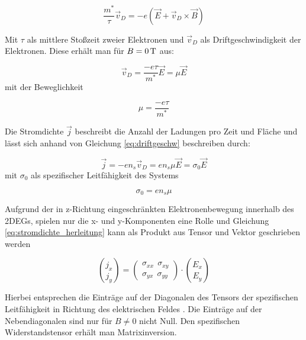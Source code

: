 \begin{equation}
\frac{m^*}{\tau} \vec{v}_D = -e(\vec{E}+\vec{v}_D \times \vec{B})
\label{eq:beweggl_stat}
\end{equation}

Mit $\tau$ als mittlere Stoßzeit zweier Elektronen und $\vec{v}_D$ als Driftgeschwindigkeit der Elektronen. Diese erhält man für $B=\unit[0]{T}$ aus:

\begin{equation}
\vec{v}_D=\frac{-e\tau}{m^*}\vec{E}=\mu\vec{E}
\label{eq:driftgeschw}
\end{equation}
mit der Beweglichkeit

\begin{equation}
\mu=\frac{-e\tau}{m^*}
\label{eq:bewegl_def}
\end{equation}

Die Stromdichte $\vec{j}$ beschreibt die Anzahl der Ladungen pro Zeit und Fläche und lässt sich anhand von Gleichung \ref{eq:driftgeschw} beschreiben durch:

\begin{equation}
\vec{j}=-en_s\vec{v}_D=en_s\mu\vec{E}=\sigma_0\vec{E}
\label{eq:stromdichte_herleitung}
\end{equation}
mit $\sigma_0$ als spezifischer Leitfähigkeit des Systems

\begin{equation}
\sigma_0=en_s\mu
\label{eq:sigma_def}
\end{equation}

Aufgrund der in z-Richtung eingeschränkten Elektronenbewegung innerhalb des 2DEGs, spielen nur die x- und y-Komponenten eine Rolle und Gleichung \ref{eq:stromdichte_herleitung} kann als Produkt aus Tensor und Vektor geschrieben werden

\begin{equation}
{j_x\choose j_y}=\begin{pmatrix}
\sigma_{xx} ~~ \sigma_{xy} \\ \sigma_{yx} ~~ \sigma_{yy}
\end{pmatrix} \cdot {E_x \choose E_y}
\label{eq:stromdichte_matrixdarst}
\end{equation}

Hierbei entsprechen die Einträge auf der Diagonalen des Tensors der spezifischen Leitfähigkeit in Richtung des elektrischen Feldes \cite[Kap.3.6]{kopitzki_einfuhrung_2009}. Die Einträge auf der Nebendiagonalen sind nur für $B\neq0$ nicht Null.
Den spezifischen Widerstandstensor erhält man Matrixinversion.


